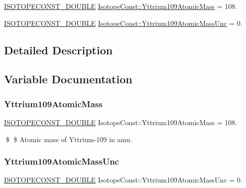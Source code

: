 \begin{DoxyCompactItemize}
\item 
\mbox{\hyperlink{group___isotope_const-_macros_ga8f45a7272ce02c0b4c65c44636ed719a}{I\+S\+O\+T\+O\+P\+E\+C\+O\+N\+S\+T\+\_\+\+D\+O\+U\+B\+LE}} \mbox{\hyperlink{group___isotope_const-_yttrium-_y109_ga19373bebe16abc966995166685415cfa}{Isotope\+Const\+::\+Yttrium109\+Atomic\+Mass}} = 108.
\item 
\mbox{\hyperlink{group___isotope_const-_macros_ga8f45a7272ce02c0b4c65c44636ed719a}{I\+S\+O\+T\+O\+P\+E\+C\+O\+N\+S\+T\+\_\+\+D\+O\+U\+B\+LE}} \mbox{\hyperlink{group___isotope_const-_yttrium-_y109_gad9a82b770838e62bd83629bdd9c653bd}{Isotope\+Const\+::\+Yttrium109\+Atomic\+Mass\+Unc}} = 0.
\end{DoxyCompactItemize}


\subsection{Detailed Description}


\subsection{Variable Documentation}
\mbox{\label{group___isotope_const-_yttrium-_y109_ga19373bebe16abc966995166685415cfa}} 
\subsubsection{\texorpdfstring{Yttrium109\+Atomic\+Mass}{Yttrium109AtomicMass}}
{\footnotesize\ttfamily \mbox{\hyperlink{group___isotope_const-_macros_ga8f45a7272ce02c0b4c65c44636ed719a}{I\+S\+O\+T\+O\+P\+E\+C\+O\+N\+S\+T\+\_\+\+D\+O\+U\+B\+LE}} Isotope\+Const\+::\+Yttrium109\+Atomic\+Mass = 108.}

\$ \$ Atomic mass of Yttrium-\/109 in amu. \mbox{\label{group___isotope_const-_yttrium-_y109_gad9a82b770838e62bd83629bdd9c653bd}} 
\subsubsection{\texorpdfstring{Yttrium109\+Atomic\+Mass\+Unc}{Yttrium109AtomicMassUnc}}
{\footnotesize\ttfamily \mbox{\hyperlink{group___isotope_const-_macros_ga8f45a7272ce02c0b4c65c44636ed719a}{I\+S\+O\+T\+O\+P\+E\+C\+O\+N\+S\+T\+\_\+\+D\+O\+U\+B\+LE}} Isotope\+Const\+::\+Yttrium109\+Atomic\+Mass\+Unc = 0.}

